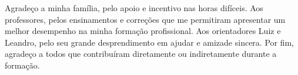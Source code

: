 \begin{agradece}	%

Agradeço a minha família, pelo apoio e incentivo nas horas difíceis. Aos professores, pelos ensinamentos e correções que me permitiram apresentar um melhor desempenho na minha formação profissional. Aos orientadores Luiz e Leandro, pelo seu grande desprendimento em ajudar e amizade sincera. Por fim, agradeço a todos que contribuíram diretamente ou indiretamente durante a formação.

\end{agradece}

